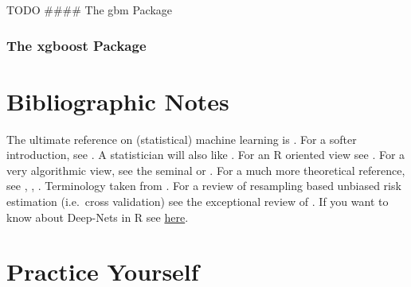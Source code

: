 \documentclass[]{book}
\theoremstyle{definition}
\theoremstyle{definition}
\theoremstyle{definition}
\theoremstyle{remark}
\begin{document}
TODO \#\#\#\# The gbm Package

\subsubsection{The xgboost Package}\label{the-xgboost-package}

\section{Bibliographic Notes}\label{bibliographic-notes-7}

The ultimate reference on (statistical) machine learning is
\citet{friedman2001elements}. For a softer introduction, see
\citet{james2013introduction}. A statistician will also like
\citet{ripley2007pattern}. For an R oriented view see
\citet{lantz2013machine}. For a very algorithmic view, see the seminal
\citet{leskovec2014mining} or \citet{conway2012machine}. For a much more
theoretical reference, see \citet{mohri2012foundations},
\citet{vapnik2013nature}, \citet{shalev2014understanding}. Terminology
taken from \citet{sammut2011encyclopedia}. For a review of resampling
based unbiased risk estimation (i.e.~cross validation) see the
exceptional review of \citet{arlot2010survey}. If you want to know about
Deep-Nets in R see
\href{https://www.datacamp.com/community/tutorials/keras-r-deep-learning}{here}.

\section{Practice Yourself}\label{practice-yourself-6}
\end{document}
